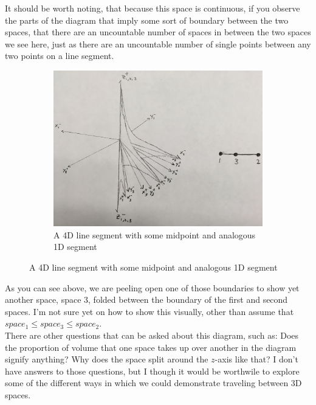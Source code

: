 \documentclass[20pt]{article} %
\begin{document}
\newpage
It should be worth noting, that because this space is continuous, if you observe the parts of the diagram that imply some sort of boundary between the two spaces, that there are an uncountable number of spaces in between the two spaces we see here, just as there are an uncountable number of single points between any two points on a line segment.

\begin{figure}[!htbp]
  	\centering
   	\begin{subfigure}[p]{1.0\linewidth}
    	\includegraphics[width=\linewidth]{./figures/fig4.jpg}
	\caption{A 4D line segment with some midpoint and analogous 1D segment}
	\label{fig:sub1}
   	\end{subfigure}
\end{figure} 

As you can see above, we are peeling open one of those boundaries to show yet another space, space $3$, folded between the boundary of the first and second spaces.  I'm not sure yet on how to show this visually, other than assume that $space_1 \leq space_3 \leq space_2$. \\ 

\newpage
There are other questions that can be asked about this diagram, such as: Does the proportion of volume that one space takes up over another in the diagram signify anything? Why does the space split around the $z$-axis like that? I don't have answers to those questions, but I though it would be worthwile to explore some of the different ways in which we could demonstrate traveling between 3D spaces.
\end{document}
